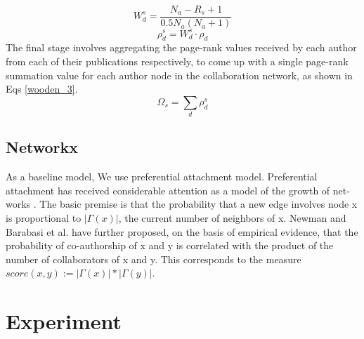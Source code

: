 \documentclass[conference]{IEEEtran}
\begin{document}
\begin{equation}
W_d^s = \frac{N_a-R_s +1}{0.5N_a(N_a+1)}
\label{wooden_1}
\end{equation}
\begin{equation}
	\rho_d^s = W_d^s \cdot \rho_d
\label{wooden_2}
\end{equation}
The final stage involves aggregating the page-rank values received by each author from each of their publications respectively, to come up with a single page-rank summation value for each author node in the collaboration network, as shown in Eqs \ref{wooden_3}.
\begin{equation}
\Omega_s =\sum_d \rho_d^s 
\label{wooden_3}
\end{equation}
\subsection{Networkx}
As a baseline model, We use preferential attachment model. Preferential attachment has received considerable attention as a model of the growth of net-works \cite{mitzenmacher2004brief}. The basic premise is that the probability that a new edge involves node x is proportional to $|\Gamma(x)|$, the current number of neighbors of x. Newman \cite{newman2001clustering} and Barabasi et al. \cite{barabasi2002evolution} have further proposed, on the basis of empirical evidence, that the probability of co-authorship of x and y is correlated with the product of the number of collaborators of x and y. This corresponds to the measure $score(x, y) := |\Gamma(x)|*|\Gamma(y)|$. 
\section{Experiment}
\end{document}
